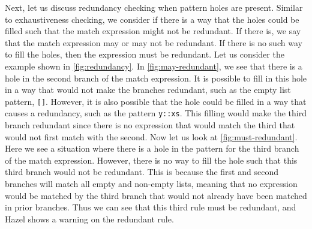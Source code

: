 Next, let us discuss redundancy checking when pattern holes are present. Similar to exhaustiveness checking, we consider if there is a way that the holes could be filled such that the match expression might not be redundant. If there is, we say that the match expression may or may not be redundant. If there is no such way to fill the holes, then the expression must be redundant. Let us consider the example shown in \autoref{fig:redundancy}. In \autoref{fig:may-redundant}, we see that there is a hole in the second branch of the match expression. It is possible to fill in this hole in a way that would not make the branches redundant, such as the empty list pattern, \texttt{[]}. However, it is also possible that the hole could be filled in a way that causes a redundancy, such as the pattern \texttt{y::xs}. This filling would make the third branch redundant since there is no expression that would match the third that would not first match with the second. Now let us look at \autoref{fig:must-redundant}. Here we see a situation where there is a hole in the pattern for the third branch of the match expression. However, there is no way to fill the hole such that this third branch would not be redundant. This is because the first and second branches will match all empty and non-empty lists, meaning that no expression would be matched by the third branch that would not already have been matched in prior branches. Thus we can see that this third rule must be redundant, and Hazel shows a warning on the redundant rule.

